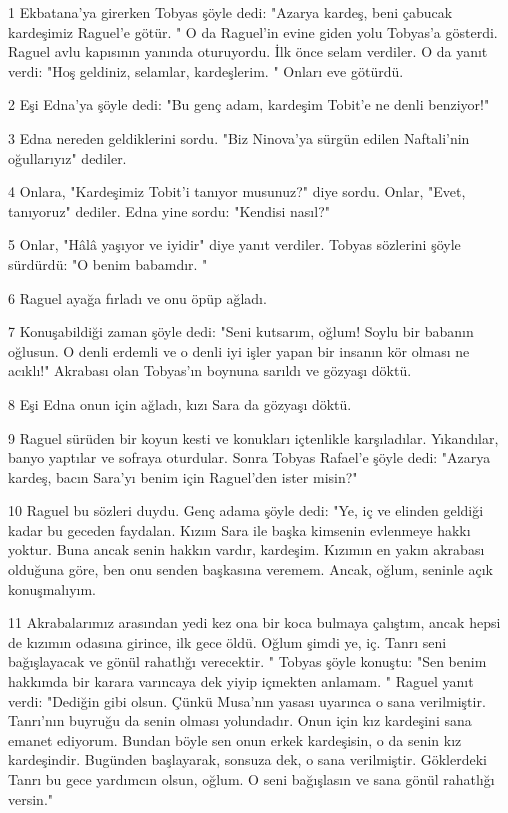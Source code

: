 \par 1 Ekbatana'ya girerken Tobyas şöyle dedi: "Azarya kardeş, beni çabucak kardeşimiz Raguel'e götür. " O da Raguel'in evine giden yolu Tobyas'a gösterdi. Raguel avlu kapısının yanında oturuyordu. İlk önce selam verdiler. O da yanıt verdi: "Hoş geldiniz, selamlar, kardeşlerim. " Onları eve götürdü.
\par 2 Eşi Edna'ya şöyle dedi: "Bu genç adam, kardeşim Tobit'e ne denli benziyor!"
\par 3 Edna nereden geldiklerini sordu. "Biz Ninova'ya sürgün edilen Naftali'nin oğullarıyız" dediler.
\par 4 Onlara, "Kardeşimiz Tobit'i tanıyor musunuz?" diye sordu. Onlar, "Evet, tanıyoruz" dediler. Edna yine sordu: "Kendisi nasıl?"
\par 5 Onlar, "Hâlâ yaşıyor ve iyidir" diye yanıt verdiler. Tobyas sözlerini şöyle sürdürdü: "O benim babamdır. "
\par 6 Raguel ayağa fırladı ve onu öpüp ağladı.
\par 7 Konuşabildiği zaman şöyle dedi: "Seni kutsarım, oğlum! Soylu bir babanın oğlusun. O denli erdemli ve o denli iyi işler yapan bir insanın kör olması ne acıklı!" Akrabası olan Tobyas'ın boynuna sarıldı ve gözyaşı döktü.
\par 8 Eşi Edna onun için ağladı, kızı Sara da gözyaşı döktü.
\par 9 Raguel sürüden bir koyun kesti ve konukları içtenlikle karşıladılar. Yıkandılar, banyo yaptılar ve sofraya oturdular. Sonra Tobyas Rafael'e şöyle dedi: "Azarya kardeş, bacın Sara'yı benim için Raguel'den ister misin?"
\par 10 Raguel bu sözleri duydu. Genç adama şöyle dedi: "Ye, iç ve elinden geldiği kadar bu geceden faydalan. Kızım Sara ile başka kimsenin evlenmeye hakkı yoktur. Buna ancak senin hakkın vardır, kardeşim. Kızımın en yakın akrabası olduğuna göre, ben onu senden başkasına veremem. Ancak, oğlum, seninle açık konuşmalıyım.
\par 11 Akrabalarımız arasından yedi kez ona bir koca bulmaya çalıştım, ancak hepsi de kızımın odasına girince, ilk gece öldü. Oğlum şimdi ye, iç. Tanrı seni bağışlayacak ve gönül rahatlığı verecektir. " Tobyas şöyle konuştu: "Sen benim hakkımda bir karara varıncaya dek yiyip içmekten anlamam. " Raguel yanıt verdi: "Dediğin gibi olsun. Çünkü Musa'nın yasası uyarınca o sana verilmiştir. Tanrı'nın buyruğu da senin olması yolundadır. Onun için kız kardeşini sana emanet ediyorum. Bundan böyle sen onun erkek kardeşisin, o da senin kız kardeşindir. Bugünden başlayarak, sonsuza dek, o sana verilmiştir. Göklerdeki Tanrı bu gece yardımcın olsun, oğlum. O seni bağışlasın ve sana gönül rahatlığı ver­sin."
